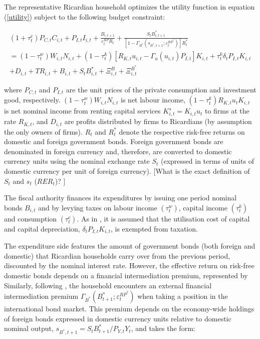 \documentclass[a4paper,11pt]{article}
\numberwithin{equation}{section}
\begin{document}
	The representative Ricardian household optimizes the utility function in equation (\ref{utility}) subject to the following budget constraint:
	
	\begin{multline} \label{budget}
	(1+\tau_t^c)P_{C,t}C_{i,t} +P_{I,t}I_{i,t}+\frac{B_{i,t+1}}{\varepsilon^{RP}_t R_t}+\frac{S_tB^*_{i,t+1}}{[1-\Gamma_{B^*}\left(s_{B^*,t+1};\varepsilon^{RP^*}_t\right)]R^*_t} \\
	= (1-\tau^w_t)W_{i,t}N_{i,t}+(1-\tau_t^k)\left[R_{K,t}u_{i,t}-\Gamma_u(u_{i,t})P_{I,t}\right]K_{i,t}+\tau_t^k\delta_tP_{I,t}K_{i,t}\\
	+D_{i,t}+TR_{i,t}+B_{i,t}+S_tB^*_{i,t}+\Xi_{i,t}^B+\Xi_{i,t}^{B^*}
	\end{multline}
	
	where $P_{C,t}$ and $P_{I,t}$ are the unit prices of the private consumption and investment good, respectively. $(1-\tau^w_t)W_{i,t}N_{i,t}$	is net labour income, $(1-\tau_t^k)R_{K,t}u_tK_{i,t}$ is net nominal income from renting capital services $K_{i,t}^s=K_{i,t}u_t$ to firms at the rate $R_{K,t}$, and $D_{i,t}$ are profits distributed by firms to Ricardians (by assumption the only owners of firms). $R_t$ and $R^*_t$ denote the respective risk-free returns on domestic and foreign government bonds. Foreign government bonds are denominated in foreign currency and, therefore, are converted to domestic currency units using the nominal exchange rate $S_t$ (expressed in terms of units of domestic currency per unit of foreign currency). {\color{red}[What is the exact definition of $S_t$ and $s_t$ ($RER_t$)? ]}
	
	The fiscal authority finances its expenditures by issuing one period nominal bonds $B_{i,t}$ and by levying taxes on labour income $(\tau_t^w)$, capital income $(\tau_t^k)$ and consumption $(\tau_t^c)$. As in \cite{coenen2013}, it is assumed that the utilisation cost of capital and capital depreciation, $\delta_tP_{I,t}K_{i,t}$, is exempted from taxation. 
	
	The expenditure side features the amount of government bonds (both foreign and domestic) that Ricardian households carry over from the previous period, discounted by the nominal interest rate. However, the effective return on risk-free domestic bonds depends on a financial intermediation premium, represented by {} Similarly, following \cite{christoffel2008}, the household encounters an external financial intermediation premium $\Gamma_{B^*}\left(B^*_{t+1};\varepsilon^{RP^*}_t\right)$ when taking a position in the international bond market. This premium depends on the economy-wide holdings of foreign bonds expressed in domestic currency units relative to domestic nominal output, $s_{B^*,t+1}=S_tB^*_{t+1}/P_{Y,t}Y_t$, and takes the form:
	
\end{document}
